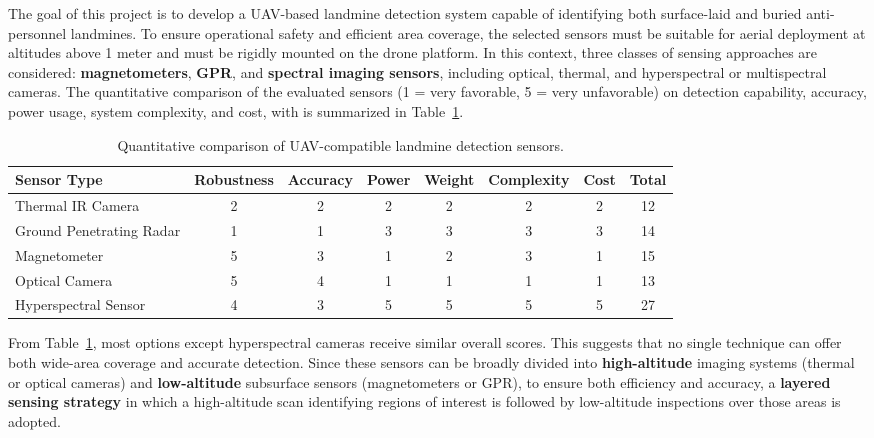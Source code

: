 The goal of this project is to develop a \gls{UAV}-based landmine detection system capable of identifying both surface-laid and buried anti-personnel landmines. To ensure operational safety and efficient area coverage, the selected sensors must be suitable for aerial deployment at altitudes above 1 meter and must be rigidly mounted on the drone platform. In this context, three classes of sensing approaches are considered: \textbf{magnetometers}, \textbf{\gls{GPR}}, and \textbf{spectral imaging sensors}, including optical, thermal, and hyperspectral or multispectral cameras. The quantitative comparison of the evaluated sensors (1 = very favorable, 5 = very unfavorable) on detection capability, accuracy, power usage, system complexity, and cost, with is summarized in Table~\ref{tab:sensor_comparison}.


\begin{table}[h]
    \centering
    \small
    \renewcommand{\arraystretch}{1.3}
    \caption[Comparison of UAV landmine detection sensors]{Quantitative comparison of UAV-compatible landmine detection sensors.}
    \label{tab:sensor_comparison}
    \begin{tabular}{l c c c c c c c}
        \toprule
        \textbf{Sensor Type} & \textbf{Robustness} & \textbf{Accuracy} & \textbf{Power} & \textbf{Weight} & \textbf{Complexity} & \textbf{Cost} & \textbf{Total} \\
        \midrule
        Thermal \gls{IR} Camera        & 2 & 2 & 2 & 2 & 2 & 2 & 12 \\
        Ground Penetrating Radar & 1 & 1 & 3 & 3 & 3 & 3 & 14 \\
        Magnetometer             & 5 & 3 & 1 & 2 & 3 & 1 & 15 \\
        Optical Camera           & 5 & 4 & 1 & 1 & 1 & 1 & 13 \\
        Hyperspectral Sensor     & 4 & 3 & 5 & 5 & 5 & 5 & 27 \\
        \bottomrule
    \end{tabular}
\end{table}

From Table~\ref{tab:sensor_comparison}, most options except hyperspectral cameras receive similar overall scores. This suggests that no single technique can offer both wide-area coverage and accurate detection. Since these sensors can be broadly divided into \textbf{high-altitude} imaging systems (thermal or optical cameras) and \textbf{low-altitude} subsurface sensors (magnetometers or \gls{GPR}), to ensure both efficiency and accuracy, a \textbf{layered sensing strategy} in which a high-altitude scan identifying regions of interest is followed by low-altitude inspections over those areas is adopted.


